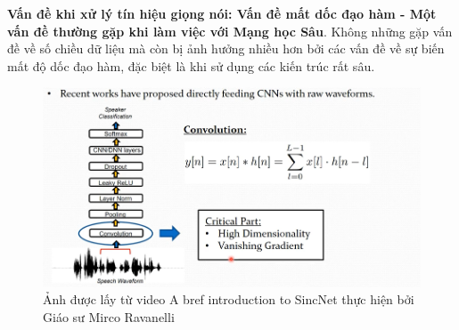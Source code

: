 \documentclass{article}
\begin{document}
	\textbf{Vấn đề khi xử lý tín hiệu giọng nói: Vấn đề mất dốc đạo hàm - Một vấn đề thường gặp khi làm việc với Mạng học Sâu}. Không những gặp vấn đề về số chiều dữ liệu mà còn bị ảnh hưởng nhiều hơn bởi các vấn đề về sự biến mất độ dốc đạo hàm, đặc biệt là khi sử dụng các kiến trúc rất sâu.
	\begin{figure}[H]
		\centering
		\includegraphics[width=1\textwidth]{images/cnns_problems.png}
		\caption{Ảnh được lấy từ video A bref introduction to SincNet thực hiện bởi Giáo sư Mirco Ravanelli}
		\label{fig:writing-thesis}
	\end{figure}
	
\end{document}
